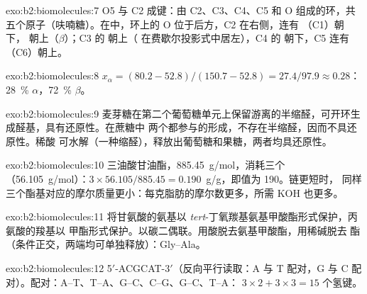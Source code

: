 \begin{solution}{exo:b2:biomolecules:7}
O5 与 C2 成键：由 C2、C3、C4、C5 和 O 组成的环，共五个原子（呋喃糖）。在中，环上的 O
位于后方，C2 在右侧，连有 （C1）朝下， 朝上（$\beta$）；C3 的  朝上（
在费歇尔投影式中居左），C4 的  朝下，C5 连有 （C6）朝上。
\end{solution}

\begin{solution}{exo:b2:biomolecules:8}
$x_\alpha = (80.2 - 52.8)/(150.7 - 52.8) = 27.4/97.9 \approx 0.28$：28~\% $\alpha$，72~\% $\beta$。
\end{solution}

\begin{solution}{exo:b2:biomolecules:9}
麦芽糖在第二个葡萄糖单元上保留游离的半缩醛，可开环生成醛基，具有还原性。在蔗糖中
两个都参与的形成，不存在半缩醛，因而不具还原性。稀酸
可水解（一种缩醛），释放出葡萄糖和果糖，两者均具还原性。
\end{solution}

\begin{solution}{exo:b2:biomolecules:10}
三油酸甘油酯，\qty{885.45}{g/mol}，消耗三个 （\qty{56.105}{g/mol}）：$3 \times 56.105/885.45 =
0.190$~g/g，即值为 190。链更短时，
同样三个酯基对应的摩尔质量更小：每克脂肪的摩尔数更多，所需 KOH 也更多。
\end{solution}

\begin{solution}{exo:b2:biomolecules:11}
将甘氨酸的氨基以 \textit{tert}-丁氧羰基氨基甲酸酯形式保护，丙氨酸的羧基以
甲酯形式保护。以碳二偶联。用酸脱去氨基甲酸酯，用稀碱脱去
酯（条件正交，两端均可单独释放）：Gly--Ala。
\end{solution}

\begin{solution}{exo:b2:biomolecules:12}
5$'$-ACGCAT-3$'$（反向平行读取：A 与 T 配对，G 与 C 配对）。配对：A--T、T--A、G--C、C--G、G--C、T--A：
$3 \times 2 + 3 \times 3 = 15$ 个氢键。
\end{solution}

